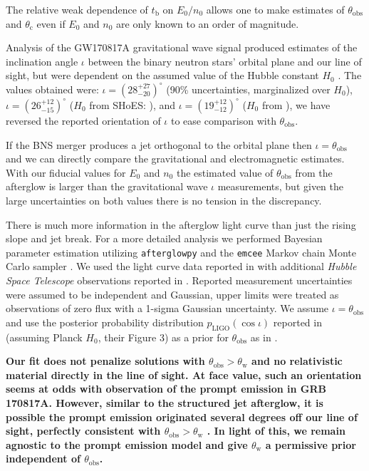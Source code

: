 \documentclass[twocolumn]{aastex62}
\newcommand{\gwbns}{GW170817A}
\newcommand{\grbbns}{GRB 170817A}
\newcommand{\afterglowpy}{{\tt afterglowpy}}
\newcommand{\emcee}{{\tt emcee}}
\newcommand{\hubble}{{\em Hubble Space Telescope}}
\newcommand{\tb}{\ensuremath{t_{\mathrm{b}}}}
\newcommand{\thobs}{\ensuremath{\theta_{\mathrm{obs}}}}
\newcommand{\thW}{\ensuremath{\theta_{\mathrm{w}}}}
\newcommand{\thC}{\ensuremath{\theta_{\mathrm{c}}}}
\begin{document}
The relative weak dependence of $\tb$ on $E_0/n_0$ allows one to make estimates of $\thobs$ and $\thC$ even if $E_0$ and $n_0$ are only known to an order of magnitude. 

 Analysis of the \gwbns{} gravitational wave signal produced estimates of the inclination angle $\iota$ between the binary neutron stars' orbital plane and our line of sight, but were dependent on the assumed value of the Hubble constant $H_0$ \citep{Abbott:2017aa}.  The values obtained were:
 $\iota = \left({28}^{+27}_{-20}\right)^\circ$ (90\% uncertainties, marginalized over $H_0$), $\iota = \left(26^{+12}_{-15}\right)^\circ$ ($H_0$ from SHoES: \citet{Riess:2016aa}), and $\iota = \left(19^{+12}_{-12}\right)^\circ$ ($H_0$ from \citet{Planck-Collaboration:2016aa}), we have reversed the reported orientation of $\iota$ to ease comparison with $\thobs$.
 
If the BNS merger produces a jet orthogonal to the orbital plane then $\iota = \thobs$ and we can directly compare the gravitational and electromagnetic estimates.  With our fiducial values for $E_0$ and $n_0$ the estimated value of $\thobs$ from the afterglow is larger than the gravitational wave $\iota$ measurements, but given the large uncertainties on both values there is no tension in the discrepancy.

There is much more information in the afterglow light curve than just the rising slope and jet break.  For a more detailed analysis we performed Bayesian parameter estimation utilizing \afterglowpy{} and the \emcee{} Markov chain Monte Carlo sampler \citep{Foreman-Mackey:2013aa}.  We used the light curve data reported in \citet{Troja:2019ab} with additional \hubble{} observations reported in \citet{Lamb:2019aa}. Reported measurement uncertainties were assumed to be independent and Gaussian, upper limits were treated as observations of zero flux with a 1-sigma Gaussian uncertainty. We assume $\iota = \thobs$ and use the posterior probability distribution $p_{\mathrm{LIGO}}(\cos \iota)$ reported in \citet{Abbott:2017aa} (assuming Planck $H_0$, their Figure 3) as a prior for $\thobs$ as in \citet{Troja:2018aa}.

{\bf Our fit does not penalize solutions with $\thobs > \thW$ and no relativistic material directly in the line of sight.  At face value, such an orientation seems at odds with observation of the prompt emission in \grbbns{}. However, similar to the structured jet afterglow, it is possible the prompt emission originated several degrees off our line of sight, perfectly consistent with $\thobs > \thW$ \citep{Matsumoto:2019aa, Ioka:2019aa}.  In light of this, we remain agnostic to the prompt emission model and give $\thW$ a permissive prior independent of $\thobs$. }
\end{document}

